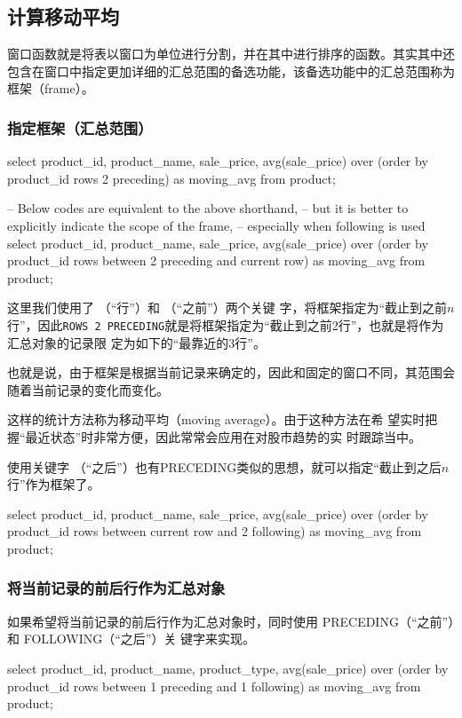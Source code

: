 \subsection{计算移动平均}
窗口函数就是将表以窗口为单位进行分割，并在其中进行排序的函数。其实其中还包含在窗口中指定更加详细的汇总范围的备选功能，该备选功能中的汇总范围称为框架（frame）。
\subsubsection{指定框架（汇总范围）}
\begin{sqlc}
select product_id, product_name, sale_price,
	avg(sale_price) over (order by product_id rows 2 preceding) as moving_avg
	from product;
	
-- Below codes are equivalent to the above shorthand, 
-- but it is better to explicitly indicate the scope of the frame,
-- especially when following is used   
select product_id, product_name, sale_price,
	avg(sale_price) over (order by product_id 
		rows between 2 preceding and current row) as moving_avg
	from product;
\end{sqlc}

这里我们使用了 （“行”）和 （“之前”）两个关键
字，将框架指定为“截止到之前$n$行”，因此\verb|ROWS 2 PRECEDING|就是将框架指定为“截止到之前2行”，也就是将作为汇总对象的记录限
定为如下的“最靠近的3行”。

也就是说，由于框架是根据当前记录来确定的，因此和固定的窗口不同，其范围会随着当前记录的变化而变化。

这样的统计方法称为移动平均（moving average）。由于这种方法在希
望实时把握“最近状态”时非常方便，因此常常会应用在对股市趋势的实
时跟踪当中。

使用关键字 （“之后”）也有PRECEDING类似的思想，就可以指定“截止到之后$n$行”作为框架了。

\begin{sqlc}
select product_id, product_name, sale_price,
	avg(sale_price) over (order by product_id 
		rows between current row and 2 following) as moving_avg
	from product;
\end{sqlc}
\subsubsection{将当前记录的前后行作为汇总对象}
如果希望将当前记录的前后行作为汇总对象时，同时使用 PRECEDING（“之前”）和 FOLLOWING（“之后”）关
键字来实现。
\begin{sqlc}
select product_id, product_name, product_type,
	avg(sale_price) over (order by product_id 
		rows between 1 preceding and 1 following) as moving_avg
	from product;
\end{sqlc}
